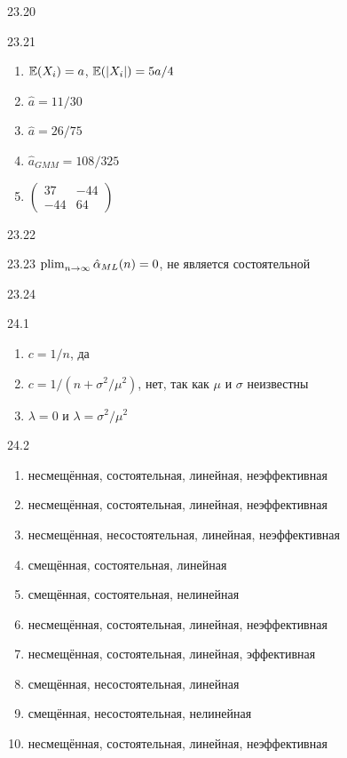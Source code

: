 \begin{solution}{{23.20}}
\end{solution}
\protect \hypertarget {soln:23.21}{}
\begin{solution}{{23.21}}
\begin{enumerate}
\item $\mathbb{E}(X_i) = a$, $\mathbb{E}(|X_i|) = 5a/4$
\item $\hat a = 11/30$
\item $\hat a = 26/75$
\item $\hat{a}_{GMM} = 108/325$
\item $\begin{pmatrix}
37 & -44 \\
-44 & 64
\end{pmatrix}$
\end{enumerate}
\end{solution}
\protect \hypertarget {soln:23.22}{}
\begin{solution}{{23.22}}
\end{solution}
\protect \hypertarget {soln:23.23}{}
\begin{solution}{{23.23}}
  $\operatorname*{plim}_{n\rightarrow\infty} \hat\alpha_{ML}(n) = 0$, не является состоятельной
\end{solution}
\protect \hypertarget {soln:23.24}{}
\begin{solution}{{23.24}}

\end{solution}
\protect \hypertarget {soln:24.1}{}
\begin{solution}{{24.1}}
    \begin{enumerate}
      \item $c=1/n$, да
      \item $c=1/(n+\sigma^2/\mu^2)$, нет, так как $\mu$ и $\sigma$ неизвестны
      \item $\lambda=0$ и $\lambda=\sigma^2/\mu^2$
    \end{enumerate}
  
\end{solution}
\protect \hypertarget {soln:24.2}{}
\begin{solution}{{24.2}}
    \begin{enumerate}
    \item несмещённая, состоятельная, линейная, неэффективная
    \item несмещённая, состоятельная, линейная, неэффективная
    \item несмещённая, несостоятельная, линейная, неэффективная
    \item смещённая, состоятельная, линейная
    \item смещённая, состоятельная, нелинейная
    \item несмещённая, состоятельная, линейная, неэффективная
    \item несмещённая, состоятельная, линейная, эффективная
    \item смещённая, несостоятельная, линейная
    \item смещённая, несостоятельная, нелинейная
    \item несмещённая, состоятельная, линейная, неэффективная
    \end{enumerate}
  
\end{solution}
